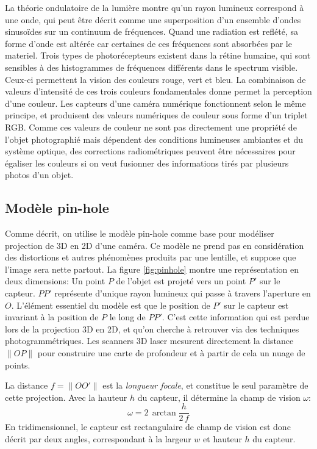 \documentclass[a4paper,10pt]{scrreprt}
\begin{document}
La théorie ondulatoire de la lumière montre qu'un rayon lumineux correspond à une onde, qui peut être décrit comme une superposition d'un ensemble d'ondes sinusoïdes sur un continuum de fréquences. Quand une radiation est reflété, sa forme d'onde est altérée car certaines de ces fréquences sont absorbées par le materiel. Trois types de photorécepteurs existent dans la rétine humaine, qui sont sensibles à des histogrammes de fréquences différents dans le spectrum visible. Ceux-ci permettent la vision des couleurs rouge, vert et bleu. La combinaison de valeurs d'intensité de ces trois couleurs fondamentales donne permet la perception d'une couleur. Les capteurs d'une caméra numérique fonctionnent selon le même principe, et produisent des valeurs numériques de couleur sous forme d'un triplet RGB. Comme ces valeurs de couleur ne sont pas directement une propriété de l'objet photographié mais dépendent des conditions lumineuses ambiantes et du système optique, des corrections radiométriques peuvent être nécessaires pour égaliser les couleurs si on veut fusionner des informations tirés par plusieurs photos d'un objet.


\subsection{Modèle pin-hole} \label{sec:pinhole}
Comme décrit, on utilise le modèle pin-hole comme base pour modéliser projection de 3D en 2D d'une caméra. Ce modèle ne prend pas en considération des distortions et autres phénomènes produits par une lentille, et suppose que l'image sera nette partout. La figure \ref{fig:pinhole} montre une représentation en deux dimensions: Un point $P$ de l'objet est projeté vers un point $P'$ sur le capteur. $P P'$ représente d'unique rayon lumineux qui passe à travers l'aperture en $O$. L'élément essentiel du modèle est que le position de $P'$ sur le capteur est invariant à la position de $P$ le long de $P P'$. C'est cette information qui est perdue lors de la projection 3D en 2D, et qu'on cherche à retrouver via des techniques photogrammétriques. Les scanners 3D laser mesurent directement la distance $\|O P\|$ pour construire une carte de profondeur et à partir de cela un nuage de points.

La distance $f = \|O O'\|$ est la \emph{longueur focale}, et constitue le seul paramètre de cette projection. Avec la hauteur $h$ du capteur, il détermine la champ de vision $\omega$:
\begin{equation*}
	\omega = 2 \, \arctan \frac{h}{2 \, f}
\end{equation*}
En tridimensionnel, le capteur est rectangulaire de champ de vision est donc décrit par deux angles, correspondant à la largeur $w$ et hauteur $h$ du capteur.
\end{document}
